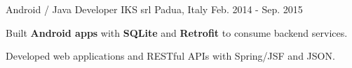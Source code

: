 \begin{cventries}
  \cventry
    {Android / Java Developer} %
    {IKS srl} %
	{Padua, Italy} %
    {Feb. 2014 - Sep. 2015} %
    {
      \begin{cvitems} %
        \item {Built \textbf{Android apps} with \textbf{SQLite} and \textbf{Retrofit} to consume backend services}.
        \item {Developed web applications and RESTful APIs with Spring/JSF and JSON}.
      \end{cvitems}
    }

\end{cventries}
